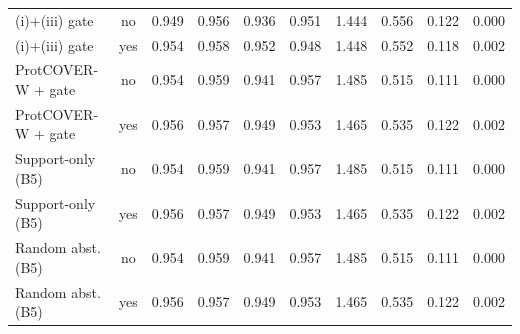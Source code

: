 \begin{longtable}{lccccccccc}
(i)+(iii) gate & no & 0.949 & 0.956 & 0.936 & 0.951 & 1.444 & 0.556 & 0.122 & 0.000 \\
(i)+(iii) gate & yes & 0.954 & 0.958 & 0.952 & 0.948 & 1.448 & 0.552 & 0.118 & 0.002 \\
ProtCOVER-W + gate & no & 0.954 & 0.959 & 0.941 & 0.957 & 1.485 & 0.515 & 0.111 & 0.000 \\
ProtCOVER-W + gate & yes & 0.956 & 0.957 & 0.949 & 0.953 & 1.465 & 0.535 & 0.122 & 0.002 \\
Support-only (B5) & no & 0.954 & 0.959 & 0.941 & 0.957 & 1.485 & 0.515 & 0.111 & 0.000 \\
Support-only (B5) & yes & 0.956 & 0.957 & 0.949 & 0.953 & 1.465 & 0.535 & 0.122 & 0.002 \\
Random abst. (B5) & no & 0.954 & 0.959 & 0.941 & 0.957 & 1.485 & 0.515 & 0.111 & 0.000 \\
Random abst. (B5) & yes & 0.956 & 0.957 & 0.949 & 0.953 & 1.465 & 0.535 & 0.122 & 0.002 \\
\bottomrule
\end{longtable}

